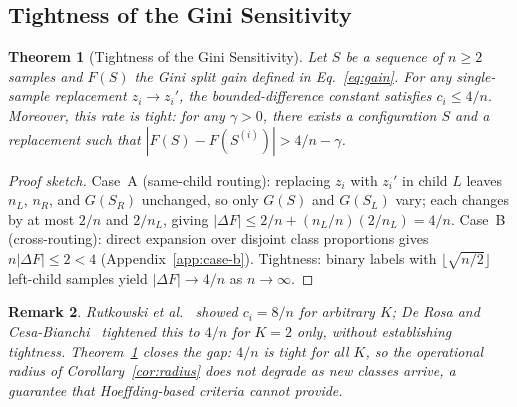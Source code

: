 \documentclass{article}
\newtheorem{theorem}{Theorem}[section]
\newtheorem{remark}[theorem]{Remark}
\begin{document}
\subsection{Tightness of the Gini Sensitivity}
\label{sec:theory-tight}
\begin{theorem}[Tightness of the Gini Sensitivity]
\label{thm:tight}
Let $S$ be a sequence of $n \geq 2$ samples and $F(S)$ the Gini split
gain defined in Eq.~\eqref{eq:gain}. For any single-sample replacement
$z_i \to z_i'$, the bounded-difference constant satisfies $c_i \leq 4/n$.
Moreover, this rate is tight: for any $\gamma > 0$, there exists a
configuration $S$ and a replacement such that
$|F(S) - F(S^{(i)})| > 4/n - \gamma$.
\end{theorem}

\begin{proof}[Proof sketch]
Case~A (same-child routing): replacing $z_i$ with $z_i'$ in child $L$
leaves $n_L$, $n_R$, and $G(S_R)$ unchanged, so only $G(S)$ and
$G(S_L)$ vary; each changes by at most $2/n$ and $2/n_L$, giving
$|\Delta F| \leq 2/n + (n_L/n)(2/n_L) = 4/n$.
Case~B (cross-routing): direct expansion over disjoint class proportions
gives $n|\Delta F| \leq 2 < 4$ (Appendix~\ref{app:case-b}).
Tightness: binary labels with $\lfloor\sqrt{n/2}\rfloor$ left-child
samples yield $|\Delta F| \to 4/n$ as $n \to \infty$.
\end{proof}

\begin{remark}
\label{rem:k-independence}
Rutkowski et al.~\cite{rutkowski2013} showed $c_i = 8/n$ for arbitrary $K$;
De Rosa and Cesa-Bianchi~\cite{derosa2015splitting} tightened this to $4/n$
for $K=2$ only, without establishing tightness.
Theorem~\ref{thm:tight} closes the gap: $4/n$ is tight for all $K$,
so the operational radius of Corollary~\ref{cor:radius} does not degrade
as new classes arrive, a guarantee that Hoeffding-based criteria cannot provide.
\end{remark}
\end{document}
